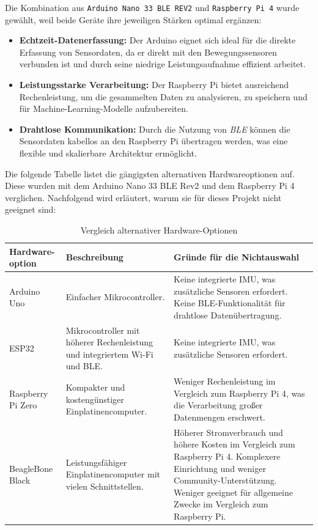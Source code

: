 Die Kombination aus \texttt{Arduino Nano 33 BLE REV2} und \texttt{Raspberry Pi 4} wurde gewählt, weil beide Geräte ihre jeweiligen Stärken optimal ergänzen:

\begin{itemize}
	\item \textbf{Echtzeit-Datenerfassung:} Der Arduino eignet sich ideal für die direkte Erfassung von Sensordaten, da er direkt mit den Bewegungssensoren verbunden ist und durch seine niedrige Leistungsaufnahme effizient arbeitet.
	\item \textbf{Leistungsstarke Verarbeitung:} Der Raspberry Pi bietet ausreichend Rechenleistung, um die gesammelten Daten zu analysieren, zu speichern und für Machine-Learning-Modelle aufzubereiten.
	\item \textbf{Drahtlose Kommunikation:} Durch die Nutzung von \emph{BLE} können die Sensordaten kabellos an den Raspberry Pi übertragen werden, was eine flexible und skalierbare Architektur ermöglicht.
\end{itemize}

Die folgende Tabelle listet die gängigsten alternativen Hardwareoptionen auf. Diese wurden mit dem Arduino Nano 33 BLE Rev2 und dem Raspberry Pi 4 verglichen. Nachfolgend wird erläutert, warum sie für dieses Projekt nicht geeignet sind:

\bgroup
\def\arraystretch{1.5}
\begin{table}[h!]
	\centering
	\begin{tabular}{|p{3cm}|p{5cm}|p{6cm}|}
		\hline
		\textbf{Hardware- option} & \textbf{Beschreibung} & \textbf{Gründe für die Nichtauswahl} \\
		\hline 
		Arduino Uno & Einfacher Mikrocontroller. & Keine integrierte IMU, was zusätzliche Sensoren erfordert. Keine BLE-Funktionalität für drahtlose Datenübertragung. \\
		\hline
		ESP32 & Mikrocontroller mit höherer Rechenleistung und integriertem Wi-Fi und BLE. & Keine integrierte IMU, was zusätzliche Sensoren erfordert. \\
		\hline
		Raspberry Pi Zero & Kompakter und kostengünstiger Einplatinencomputer. & Weniger Rechenleistung im Vergleich zum Raspberry Pi 4, was die Verarbeitung großer Datenmengen erschwert. \cite{gamess2022performance}\\
		\hline
		BeagleBone Black & Leistungsfähiger Einplatinencomputer mit vielen Schnittstellen. & Höherer Stromverbrauch und höhere Kosten im Vergleich zum Raspberry Pi 4. Komplexere Einrichtung und weniger Community-Unterstützung. Weniger geeignet für allgemeine Zwecke im Vergleich zum Raspberry Pi. \cite{patil2016comparative} \\
		\hline
	\end{tabular}
	\caption{Vergleich alternativer Hardware-Optionen}
	\label{tab:hardware_vergleich}
\end{table}
\egroup

